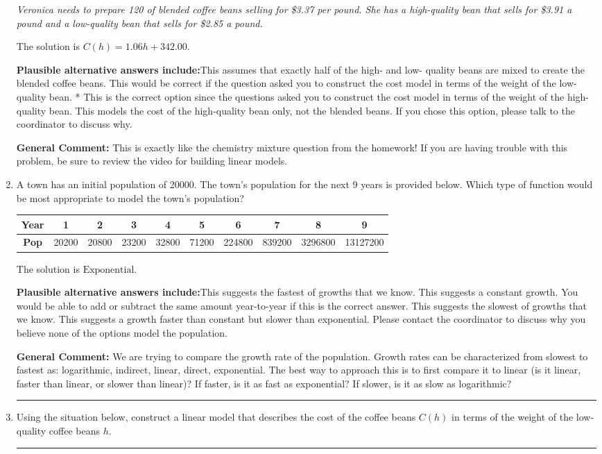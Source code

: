 \documentclass{extbook}[14pt]
\newcommand{\litem}[1]{\item #1

\rule{\textwidth}{0.4pt}}
\begin{document}
\begin{enumerate}
{\begin{center}
    \textit{ Veronica needs to prepare 120 of blended coffee beans selling for \$3.37 per pound. She has a high-quality bean that sells for \$3.91 a pound and a low-quality bean that sells for \$2.85 a pound. }
\end{center}
The solution is \( C(h) = 1.06 h + 342.00 \).\begin{enumerate}[label=\Alph*.]
\textbf{Plausible alternative answers include:}This assumes that exactly half of the high- and low- quality beans are mixed to create the blended coffee beans.
This would be correct if the question asked you to construct the cost model in terms of the weight of the low-quality bean.
* This is the correct option since the questions asked you to construct the cost model in terms of the weight of the high-quality bean.
This models the cost of the high-quality bean only, not the blended beans.
If you chose this option, please talk to the coordinator to discuss why.
\end{enumerate}

\textbf{General Comment:} This is exactly like the chemistry mixture question from the homework! If you are having trouble with this problem, be sure to review the video for building linear models.
}
\litem{
A town has an initial population of 20000. The town's population for the next 9 years is provided below. Which type of function would be most appropriate to model the town's population?


\begin{tabular}{c|c|c|c|c|c|c|c|c|c}
\textbf{Year} &1 &2 &3 &4 &5 &6 &7 &8 &9\tabularnewline \hline
\textbf{Pop} &20200 &20800 &23200 &32800 &71200 &224800 &839200 &3296800 &13127200\end{tabular}The solution is \( \text{Exponential} \).\begin{enumerate}[label=\Alph*.]
\textbf{Plausible alternative answers include:}This suggests the fastest of growths that we know.
This suggests a constant growth. You would be able to add or subtract the same amount year-to-year if this is the correct answer.
This suggests the slowest of growths that we know.
This suggests a growth faster than constant but slower than exponential.
Please contact the coordinator to discuss why you believe none of the options model the population.
\end{enumerate}

\textbf{General Comment:} We are trying to compare the growth rate of the population. Growth rates can be characterized from slowest to fastest as: logarithmic, indirect, linear, direct, exponential. The best way to approach this is to first compare it to linear (is it linear, faster than linear, or slower than linear)? If faster, is it as fast as exponential? If slower, is it as slow as logarithmic?
}
\litem{
Using the situation below, construct a linear model that describes the cost of the coffee beans $C(h)$ in terms of the weight of the low-quality coffee beans $h$.

}
\end{enumerate}
\end{document}
